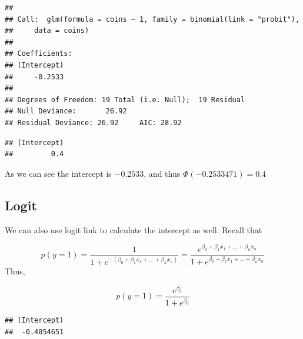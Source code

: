 \documentclass[]{book}
\newenvironment{Shaded}{\begin{snugshade}}{\end{snugshade}}
\newcommand{\KeywordTok}[1]{\textcolor[rgb]{0.13,0.29,0.53}{\textbf{#1}}}
\newcommand{\DataTypeTok}[1]{\textcolor[rgb]{0.13,0.29,0.53}{#1}}
\newcommand{\DecValTok}[1]{\textcolor[rgb]{0.00,0.00,0.81}{#1}}
\newcommand{\StringTok}[1]{\textcolor[rgb]{0.31,0.60,0.02}{#1}}
\newcommand{\OperatorTok}[1]{\textcolor[rgb]{0.81,0.36,0.00}{\textbf{#1}}}
\newcommand{\NormalTok}[1]{#1}
\begin{document}
\begin{verbatim}
## 
## Call:  glm(formula = coins ~ 1, family = binomial(link = "probit"), 
##     data = coins)
## 
## Coefficients:
## (Intercept)  
##     -0.2533  
## 
## Degrees of Freedom: 19 Total (i.e. Null);  19 Residual
## Null Deviance:       26.92 
## Residual Deviance: 26.92     AIC: 28.92
\end{verbatim}

\begin{Shaded}
\end{Shaded}

\begin{verbatim}
## (Intercept) 
##         0.4
\end{verbatim}

As we can see the intercept is \(-0.2533\), and thus
\(\Phi(-0.2533471)=0.4\)

\subsection{Logit}\label{logit-1}

We can also use logit link to calculate the intercept as well. Recall
that

\[p(y=1)=\frac{1}{1+e^{-(\beta_0+\beta_1x_1+...+\beta_nx_n)}}=\frac{e^{\beta_0+\beta_1x_1+...+\beta_nx_n}}{1+e^{\beta_0+\beta_1x_1+...+\beta_nx_n}}\]
Thus,

\[p(y=1)=\frac{e^{\beta_0}}{1+e^{\beta_0}}\]

\begin{Shaded}
\end{Shaded}

\begin{verbatim}
## (Intercept) 
##  -0.4054651
\end{verbatim}

\begin{Shaded}
\end{Shaded}
\end{document}
